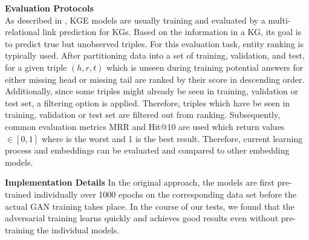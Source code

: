 \textbf{Evaluation Protocols}\\
As described in \cite{Ruffinelli2020You},
\ac{KGE} models are usually training and evaluated by a multi-relational link prediction for \acp{KG}.
Based on the information in a \ac{KG}, its goal is to predict true but unobserved triples.
For this evaluation task, entity ranking is typically used.
After partitioning data into a set of training, validation, and test, for a given triple $(h,r,t)$ which is unseen during training potential answers for either missing head or missing tail are ranked by their score in descending order.
Additionally, since some triples might already be seen in training, validation or test set, a filtering option is applied.
Therefore, triples which have be seen in training, validation or test set are filtered out from ranking.
Subsequently, common evaluation metrics MRR and Hit@10 are used which return values $\in [0,1]$ where is the worst and 1 is the best result.
Therefore, current learning process and embeddings can be evaluated and compared to other embedding models.

\textbf{Implementation Details}
In the original \kbgan approach, the models are first pre-trained individually over 1000 epochs on the corresponding data set before the actual \ac{GAN} training takes place.
In the course of our tests, we found that the adversarial training learns quickly and achieves good results even without pre-training the individual models.

